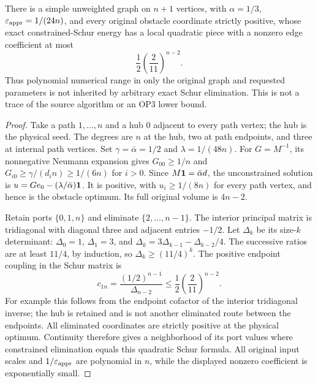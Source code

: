 \begin{proposition}
\label{prop:op3-positive-face-range-loss}
There is a simple unweighted graph on $n+1$ vertices, with
$\alpha=1/3$, $\varepsilon_{\mathrm{appr}}=1/(24n)$, and every original obstacle coordinate
strictly positive, whose exact constrained-Schur energy has a local
quadratic piece with a nonzero edge coefficient at most
\begin{equation}
 \frac12\left(\frac2{11}\right)^{n-2}.
 \label{eq:op3-exponentially-small-coupling}
\end{equation}
Thus polynomial numerical range in only the original graph and requested
parameters is not inherited by arbitrary exact Schur elimination.
This is not a trace of the source algorithm or an OP3 lower bound.
\end{proposition}
\begin{proof}
Take a path $1,\ldots,n$ and a hub $0$ adjacent to every path vertex;
the hub is the physical seed. The degrees are $n$ at the hub, two at
path endpoints, and three at internal path vertices. Set
$\gamma=\bar\alpha=1/2$ and $\lambda=1/(48n)$.
For $G=M^{-1}$, its nonnegative Neumann expansion gives
$G_{00}\geq1/n$ and $G_{i0}\geq\gamma/(d_i n)\geq1/(6n)$ for $i>0$.
Since $M\mathbf{1}=\bar\alpha d$, the unconstrained solution is
$u=Ge_0-(\lambda/\bar\alpha)\mathbf{1}$. It is positive, with
$u_i\geq1/(8n)$ for every path vertex, and hence is the obstacle optimum.
Its full original volume is $4n-2$.

Retain ports $\{0,1,n\}$ and eliminate $\{2,\ldots,n-1\}$.
The interior principal matrix is tridiagonal with diagonal three and
adjacent entries $-1/2$. Let $\Delta_k$ be its size-$k$ determinant:
$\Delta_0=1$, $\Delta_1=3$, and
$\Delta_k=3\Delta_{k-1}-\Delta_{k-2}/4$.
The successive ratios are at least $11/4$, by induction, so
$\Delta_k\geq(11/4)^k$.
The positive endpoint coupling in the Schur matrix is
\[
 c_{1n}=\frac{(1/2)^{n-1}}{\Delta_{n-2}}
 \leq\frac12\left(\frac2{11}\right)^{n-2}.
\]
For example this follows from the endpoint cofactor of the interior
tridiagonal inverse; the hub is retained and is not another eliminated
route between the endpoints. All eliminated coordinates are strictly
positive at the physical optimum. Continuity therefore gives a neighborhood
of its port values where constrained elimination equals this quadratic
Schur formula. All original input scales and $1/\varepsilon_{\mathrm{appr}}$ are polynomial
in $n$, while the displayed nonzero coefficient is exponentially small.
\end{proof}

